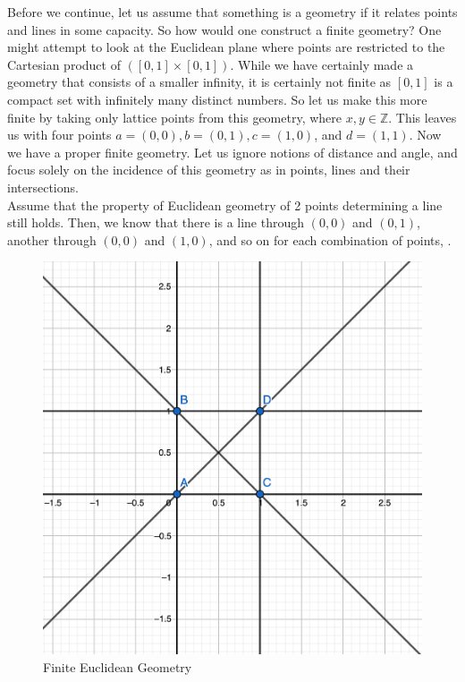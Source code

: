 \documentclass{article}
\begin{document}
Before we continue, let us assume that something is a geometry if it relates points and lines in some capacity. So how would one construct a finite geometry? One might attempt to look at the Euclidean plane where points are restricted to the Cartesian product of $([0,1] \times [0,1])$. While we have certainly made a geometry that consists of a smaller infinity, it is certainly not finite as $[0,1]$ is a compact set with infinitely many distinct numbers. So let us make this more finite by taking only lattice points from this geometry, where $x,y \in \mathbb{Z}$. This leaves us with four points $a = (0,0), b = (0,1), c = (1,0)$, and $d=(1,1)$. Now we have a proper finite geometry. Let us ignore notions of distance and angle, and focus solely on the incidence of this geometry as in points, lines and their intersections. \\ 

Assume that the property of Euclidean geometry of 2 points determining a line still holds. Then, we know that there is a line through $(0,0)$ and $(0,1)$, another through $(0,0)$ and $(1,0)$, and so on for each combination of points, .

\begin{figure}[h]
\centering
  \includegraphics[scale=.3]{final_paper_plot_1}
  \caption{Finite Euclidean Geometry}
  \label{fig:boat1}
\end{figure}
\end{document}
